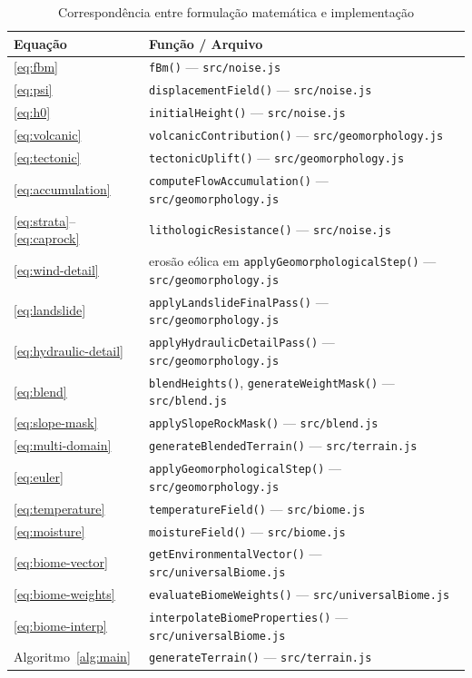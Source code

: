 \documentclass[11pt,a4paper]{article}
\begin{document}
\begin{table}[H]
\centering
\caption{Correspondência entre formulação matemática e implementação}
\label{tab:code-map}
\small
\begin{tabular}{@{}ll@{}}
\toprule
\textbf{Equação} & \textbf{Função / Arquivo} \\
\midrule
\eqref{eq:fbm}           & \texttt{fBm()} --- \texttt{src/noise.js} \\
\eqref{eq:psi}           & \texttt{displacementField()} --- \texttt{src/noise.js} \\
\eqref{eq:h0}            & \texttt{initialHeight()} --- \texttt{src/noise.js} \\
\eqref{eq:volcanic}      & \texttt{volcanicContribution()} --- \texttt{src/geomorphology.js} \\
\eqref{eq:tectonic}      & \texttt{tectonicUplift()} --- \texttt{src/geomorphology.js} \\
\eqref{eq:accumulation}  & \texttt{computeFlowAccumulation()} --- \texttt{src/geomorphology.js} \\
\eqref{eq:strata}--\eqref{eq:caprock} & \texttt{lithologicResistance()} --- \texttt{src/noise.js} \\
\eqref{eq:wind-detail}   & erosão eólica em \texttt{applyGeomorphologicalStep()} --- \texttt{src/geomorphology.js} \\
\eqref{eq:landslide}     & \texttt{applyLandslideFinalPass()} --- \texttt{src/geomorphology.js} \\
\eqref{eq:hydraulic-detail}& \texttt{applyHydraulicDetailPass()} --- \texttt{src/geomorphology.js} \\
\eqref{eq:blend}         & \texttt{blendHeights()}, \texttt{generateWeightMask()} --- \texttt{src/blend.js} \\
\eqref{eq:slope-mask}    & \texttt{applySlopeRockMask()} --- \texttt{src/blend.js} \\
\eqref{eq:multi-domain}  & \texttt{generateBlendedTerrain()} --- \texttt{src/terrain.js} \\
\eqref{eq:euler}         & \texttt{applyGeomorphologicalStep()} --- \texttt{src/geomorphology.js} \\
\eqref{eq:temperature}   & \texttt{temperatureField()} --- \texttt{src/biome.js} \\
\eqref{eq:moisture}      & \texttt{moistureField()} --- \texttt{src/biome.js} \\
\eqref{eq:biome-vector}  & \texttt{getEnvironmentalVector()} --- \texttt{src/universalBiome.js} \\
\eqref{eq:biome-weights} & \texttt{evaluateBiomeWeights()} --- \texttt{src/universalBiome.js} \\
\eqref{eq:biome-interp}  & \texttt{interpolateBiomeProperties()} --- \texttt{src/universalBiome.js} \\
Algoritmo~\ref{alg:main} & \texttt{generateTerrain()} --- \texttt{src/terrain.js} \\
\bottomrule
\end{tabular}
\end{table}
\end{document}
